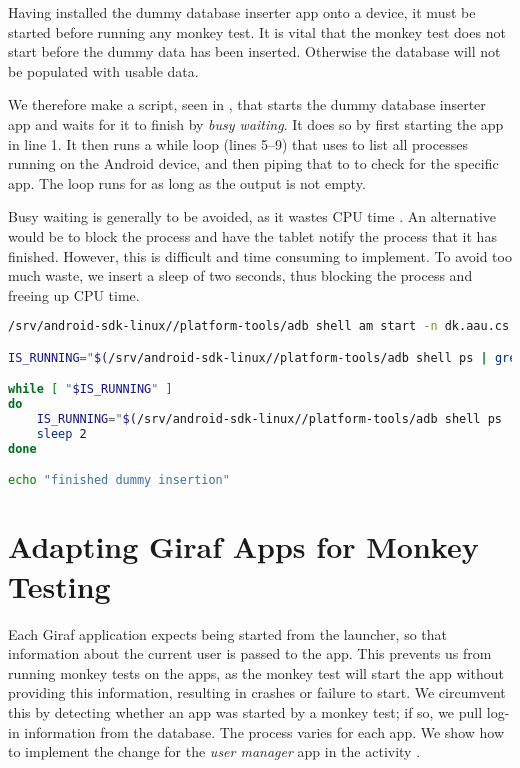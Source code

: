 Having installed the dummy database inserter app onto a device, it must be started before running any monkey test. It is vital that the monkey test does not start before the dummy data has been inserted. Otherwise the database will not be populated with usable data.

We therefore make a script, seen in , that starts the dummy database inserter app and waits for it to finish by \emph{busy waiting}. It does so by first starting the app in line 1. It then runs a while loop (lines 5--9) that uses  to list all processes running on the Android device, and then piping that to  to check for the specific app. The loop runs for as long as the output is not empty.

Busy waiting is generally to be avoided, as it wastes CPU time \parencite[ch.2]{tanenbaum2007}. An alternative would be to block the process and have the tablet notify the process that it has finished. However, this is difficult and time consuming to implement. To avoid too much waste, we insert a sleep of two seconds, thus blocking the process and freeing up CPU time.

\begin{lstlisting}[language=bash,showstringspaces=false,caption=Start and wait for dummy database inserter,label=lst:start_wait_dummy_db_inserter]
/srv/android-sdk-linux//platform-tools/adb shell am start -n dk.aau.cs.giraf.dummydbinserter/dk.aau.cs.giraf.dummydbinserter.MainActivity

IS_RUNNING="$(/srv/android-sdk-linux//platform-tools/adb shell ps | grep dk.aau.cs.giraf.dummydbinserter)"

while [ "$IS_RUNNING" ]
do
    IS_RUNNING="$(/srv/android-sdk-linux//platform-tools/adb shell ps | grep dk.aau.cs.giraf.dummydbinserter)"
    sleep 2
done

echo "finished dummy insertion"
\end{lstlisting}

\section{Adapting Giraf Apps for Monkey Testing}\label{sec:adapting_apps_for_monkey_testing}
Each Giraf application expects being started from the launcher, so that information about the current user is passed to the app. This prevents us from running monkey tests on the apps, as the monkey test will start the app without providing this information, resulting in crashes or failure to start. We circumvent this by detecting whether an app was started by a monkey test; if so, we pull log-in information from the database. The process varies for each app. We show how to implement the change for the \emph{user manager} app in the activity .


